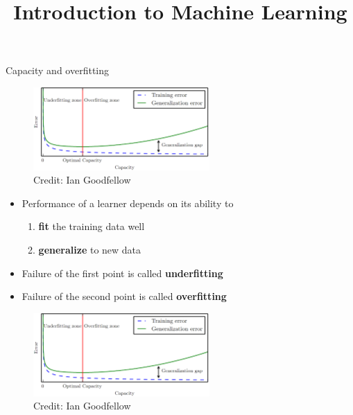 \documentclass[11pt,compress,t,notes=noshow, xcolor=table]{beamer}
\title{Introduction to Machine Learning}
\begin{document}
    



\begin{vbframe}{Capacity and overfitting}

  \begin{figure}
    \centering
    \includegraphics[width = 0.6\textwidth]{figure_man/lcurve_1.png}
    \tiny{\\ Credit: Ian Goodfellow}
  \end{figure}
  

\begin{itemize}
  \item Performance of a learner depends on its ability to 
    \begin{enumerate}
      \item \textbf{fit} the training data well
      \item \textbf{generalize} to new data
    \end{enumerate}  
  \item Failure of the first point is called \textbf{underfitting}
  \item Failure of the second point is called \textbf{overfitting}
\end{itemize}  


\framebreak

\begin{figure}
  \centering
  \includegraphics[width = 0.6\textwidth]{figure_man/lcurve_1.png}
  \tiny{\\ Credit: Ian Goodfellow}
\end{figure}



\end{vbframe}
\end{document}
